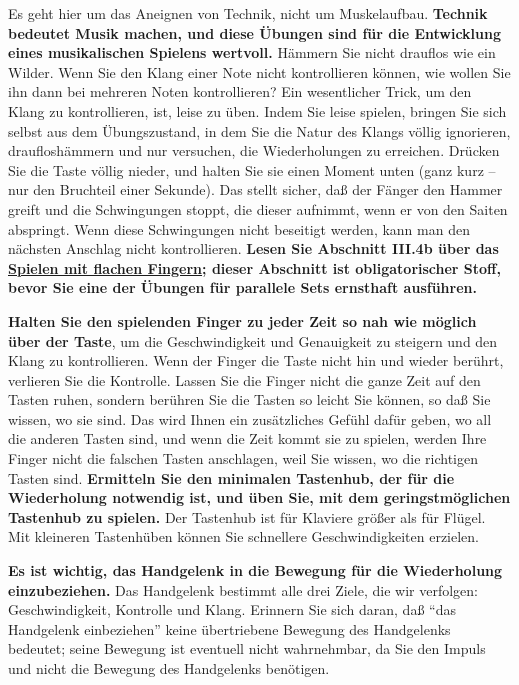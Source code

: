 Es geht hier um das Aneignen von Technik, nicht um Muskelaufbau.
\textbf{Technik bedeutet Musik machen, und diese Übungen sind für die Entwicklung eines musikalischen Spielens wertvoll.}
Hämmern Sie nicht drauflos wie ein Wilder.
Wenn Sie den Klang einer Note nicht kontrollieren können, wie wollen Sie ihn dann bei mehreren Noten kontrollieren?
Ein wesentlicher Trick, um den Klang zu kontrollieren, ist, leise zu üben.
Indem Sie leise spielen, bringen Sie sich selbst aus dem Übungszustand, in dem Sie die Natur des Klangs völlig ignorieren, draufloshämmern und nur versuchen, die Wiederholungen zu erreichen.
Drücken Sie die Taste völlig nieder, und halten Sie sie einen Moment unten (ganz kurz -- nur den Bruchteil einer Sekunde).
Das stellt sicher, daß der Fänger den Hammer greift und die Schwingungen stoppt, die dieser aufnimmt, wenn er von den Saiten abspringt.
Wenn diese Schwingungen nicht beseitigt werden, kann man den nächsten Anschlag nicht kontrollieren.
\textbf{Lesen Sie Abschnitt III.4b über das \hyperref[c1iii4b]{Spielen mit flachen Fingern}; dieser Abschnitt ist obligatorischer Stoff, bevor Sie eine der Übungen für parallele Sets ernsthaft ausführen.}

\textbf{Halten Sie den spielenden Finger zu jeder Zeit so nah wie möglich über der Taste}, um die Geschwindigkeit und Genauigkeit zu steigern und den Klang zu kontrollieren.
Wenn der Finger die Taste nicht hin und wieder berührt, verlieren Sie die Kontrolle.
Lassen Sie die Finger nicht die ganze Zeit auf den Tasten ruhen, sondern berühren Sie die Tasten so leicht Sie können, so daß Sie wissen, wo sie sind.
Das wird Ihnen ein zusätzliches Gefühl dafür geben, wo all die anderen Tasten sind, und wenn die Zeit kommt sie zu spielen, werden Ihre Finger nicht die falschen Tasten anschlagen, weil Sie wissen, wo die richtigen Tasten sind.
\textbf{Ermitteln Sie den minimalen Tastenhub, der für die Wiederholung notwendig ist, und üben Sie, mit dem geringstmöglichen Tastenhub zu spielen.}
Der Tastenhub ist für Klaviere größer als für Flügel.
Mit kleineren Tastenhüben können Sie schnellere Geschwindigkeiten erzielen.

\textbf{Es ist wichtig, das Handgelenk in die Bewegung für die Wiederholung einzubeziehen.}
Das Handgelenk bestimmt alle drei Ziele, die wir verfolgen: Geschwindigkeit, Kontrolle und Klang.
Erinnern Sie sich daran, daß \enquote{das Handgelenk einbeziehen} keine übertriebene Bewegung des Handgelenks bedeutet; seine Bewegung ist eventuell nicht wahrnehmbar, da Sie den Impuls und nicht die Bewegung des Handgelenks benötigen.


